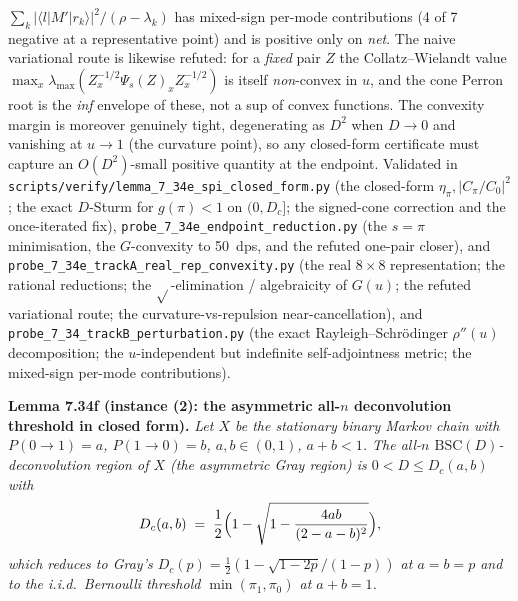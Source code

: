 \documentclass[
]{article}
\begin{document}
$\sum_{k}|\langle l|M'|r_k\rangle|^2/(\rho-\lambda_k)$ has mixed-sign per-mode
contributions (4 of 7 negative at a representative point) and is positive only
on \emph{net}. The naive variational route is likewise refuted: for a
\emph{fixed} pair $Z$ the Collatz--Wielandt value
$\max_x\lambda_{\max}(Z_x^{-1/2}\Psi_s(Z)_xZ_x^{-1/2})$ is itself
\emph{non}-convex in $u$, and the cone Perron root is the \emph{inf} envelope
of these, not a sup of convex functions. The convexity margin is moreover
genuinely tight, degenerating as $D^2$ when $D\to0$ and vanishing at $u\to1$
(the curvature point), so any closed-form certificate must capture an
$O(D^2)$-small positive quantity at the endpoint. Validated in
\texttt{scripts/verify/lemma\_7\_34e\_spi\_closed\_form.py} (the closed-form
$\eta_\pi,|C_\pi/C_0|^2$; the exact $D$-Sturm for $g(\pi)<1$ on $(0,D_c]$;
the signed-cone correction and the once-iterated fix),
\texttt{probe\_7\_34e\_endpoint\_reduction.py} (the $s=\pi$ minimisation, the
$G$-convexity to 50~dps, and the refuted one-pair closer), and
\texttt{probe\_7\_34e\_trackA\_real\_rep\_convexity.py} (the real $8\times8$
representation; the rational reductions; the $\sqrt{}$-elimination /
algebraicity of $G(u)$; the refuted variational route; the
curvature-vs-repulsion near-cancellation), and
\texttt{probe\_7\_34\_trackB\_perturbation.py} (the exact
Rayleigh--Schr\"odinger $\rho''(u)$ decomposition; the $u$-independent but
indefinite self-adjointness metric; the mixed-sign per-mode contributions).

\textbf{Lemma 7.34f (instance (2): the asymmetric all-$n$ deconvolution
threshold in closed form).} \emph{Let $X$ be the stationary binary Markov
chain with $P(0\!\to\!1)=a$, $P(1\!\to\!0)=b$, $a,b\in(0,1)$, $a+b<1$. The
all-$n$ $\mathrm{BSC}(D)$-deconvolution region of $X$ (the asymmetric Gray
region) is $0<D\le D_c(a,b)$ with}
\[
  D_c(a,b)\;=\;\frac12\Bigl(1-\sqrt{1-\frac{4ab}{(2-a-b)^2}}\Bigr),
\]
\emph{which reduces to Gray's $D_c(p)=\tfrac12(1-\sqrt{1-2p}/(1-p))$ at
$a=b=p$ and to the i.i.d.\ Bernoulli threshold $\min(\pi_1,\pi_0)$ at
$a+b=1$.}
\end{document}
